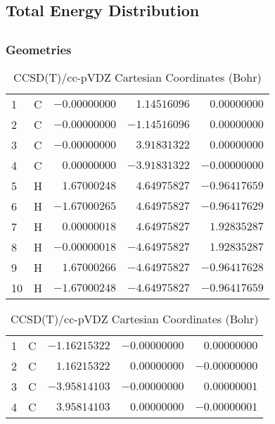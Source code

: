 \documentclass[10pt,oneside]{article}
\begin{document}
\begin{table}
\subsection*{Total Energy Distribution}
\centering\end{table}

\clearpage

\subsection{}

\begin{table}[h!]
\subsubsection*{Geometries}
\begin{multicols}{2}
\centering
\caption{CCSD(T)/cc-pVTZ Cartesian Coordinates (Bohr)}
\begin{tabular}{llrrr}
\toprule
1  & C  & $-0.00000000$ & $ 1.14516096$ & $ 0.00000000$ \\
2  & C  & $-0.00000000$ & $-1.14516096$ & $ 0.00000000$ \\
3  & C  & $-0.00000000$ & $ 3.91831322$ & $ 0.00000000$ \\
4  & C  & $ 0.00000000$ & $-3.91831322$ & $-0.00000000$ \\
5  & H  & $ 1.67000248$ & $ 4.64975827$ & $-0.96417659$ \\
6  & H  & $-1.67000265$ & $ 4.64975827$ & $-0.96417629$ \\
7  & H  & $ 0.00000018$ & $ 4.64975827$ & $ 1.92835287$ \\
8  & H  & $-0.00000018$ & $-4.64975827$ & $ 1.92835287$ \\
9  & H  & $ 1.67000266$ & $-4.64975827$ & $-0.96417628$ \\
10 & H  & $-1.67000248$ & $-4.64975827$ & $-0.96417659$ \\
\bottomrule
\end{tabular}
\caption{CCSD(T)/cc-pVDZ Cartesian Coordinates (Bohr)}
\begin{tabular}{llrrr}
\toprule
1  & C  & $-1.16215322$ & $-0.00000000$ & $ 0.00000000$ \\
2  & C  & $ 1.16215322$ & $ 0.00000000$ & $-0.00000000$ \\
3  & C  & $-3.95814103$ & $-0.00000000$ & $ 0.00000001$ \\
4  & C  & $ 3.95814103$ & $ 0.00000000$ & $-0.00000001$ \\

\end{tabular}
\end{multicols}
\end{table}
\end{document}
